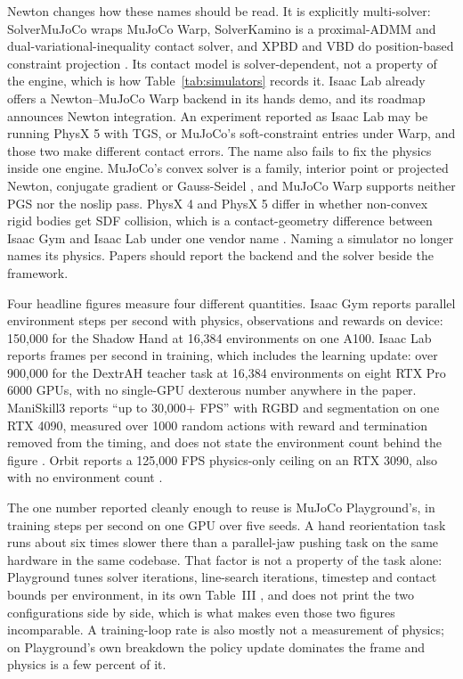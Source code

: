 Newton changes how these names should be read. It is explicitly multi-solver: SolverMuJoCo wraps
MuJoCo Warp, SolverKamino is a proximal-ADMM and dual-variational-inequality contact solver, and
XPBD and VBD do position-based constraint projection \cite{newton_2025}. Its contact model is
solver-dependent, not a property of the engine, which is how Table~\ref{tab:simulators} records
it. Isaac Lab already offers a Newton--MuJoCo Warp backend in its hands demo, and its roadmap
announces Newton integration. An experiment reported as Isaac Lab may
be running PhysX 5 with TGS, or MuJoCo's soft-constraint entries under Warp, and those two make
different contact errors. The name also fails to fix the physics inside one engine. MuJoCo's
convex solver is a family, interior point or projected Newton, conjugate gradient or Gauss-Seidel
\cite[Sec.~II-D]{mujoco_2012}, and MuJoCo Warp supports neither PGS nor the noslip pass. PhysX 4
and PhysX 5 differ in whether non-convex rigid bodies get SDF collision, which is a
contact-geometry difference between Isaac Gym and Isaac Lab under one vendor name
\cite{orbit_2023,isaaclab_2025}. Naming a simulator no longer names its physics. Papers should
report the backend and the solver beside the framework.

\label{sec:sim:throughput}
Four headline figures measure four different quantities. Isaac Gym reports parallel environment
steps per second with physics, observations and rewards on device: 150,000 for the Shadow Hand at
16,384 environments on one A100. Isaac Lab reports frames per second in training, which includes
the learning update: over 900,000 for the DextrAH teacher task at 16,384 environments on eight RTX
Pro 6000 GPUs, with no single-GPU dexterous number anywhere in the paper. ManiSkill3 reports ``up
to 30,000+ FPS'' with RGBD and segmentation on one RTX 4090, measured over 1000 random actions
with reward and termination removed from the timing, and does not state the environment count
behind the figure \cite{maniskill3_2024}. Orbit reports a 125,000 FPS physics-only ceiling on an
RTX 3090, also with no environment count \cite[Sec.~VII]{orbit_2023}.

The one number reported cleanly enough to reuse is MuJoCo Playground's, in training steps per
second on one GPU over five seeds. A hand reorientation task runs about six times slower there than
a parallel-jaw pushing task on the same hardware in the same codebase. That factor is not a
property of the task alone: Playground tunes solver iterations, line-search iterations, timestep
and contact bounds per environment, in its own Table~III \cite{mujoco_playground_2025}, and does
not print the
two configurations side by side, which is what makes even those two figures incomparable. A
training-loop rate is also mostly not a measurement of physics; on Playground's own breakdown the
policy update dominates the frame and physics is a few percent of it.


